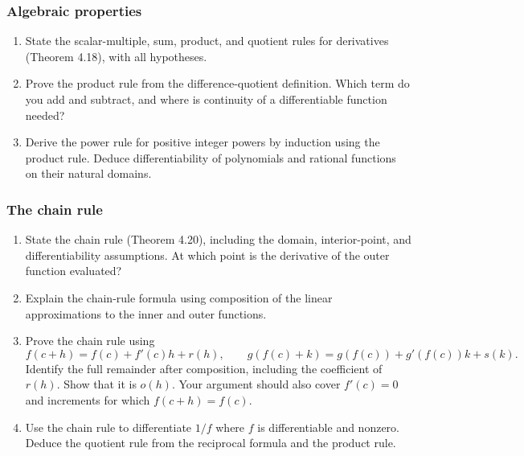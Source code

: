 \subsubsection*{Algebraic properties}
\begin{enumerate}[resume]
  \item State the scalar-multiple, sum, product, and quotient rules
    for derivatives (Theorem 4.18), with all hypotheses.

  \item Prove the product rule from the difference-quotient definition.
    Which term do you add and subtract, and where is continuity of
    a differentiable function needed?

  \item Derive the power rule for positive integer powers by induction
    using the product rule. Deduce differentiability of polynomials
    and rational functions on their natural domains.
\end{enumerate}

\subsubsection*{The chain rule}
\begin{enumerate}[resume]
  \item State the chain rule (Theorem 4.20), including the domain,
    interior-point, and differentiability assumptions.
    At which point is the derivative of the outer function evaluated?

  \item Explain the chain-rule formula using composition of the
    linear approximations to the inner and outer functions.

  \item Prove the chain rule using
    \[
      f(c+h)=f(c)+f'(c)h+r(h),\qquad
      g(f(c)+k)=g(f(c))+g'(f(c))k+s(k).
    \]
    Identify the full remainder after composition, including the
    coefficient of \(r(h)\). Show that it is \(o(h)\).
    Your argument should also cover \(f'(c)=0\) and increments
    for which \(f(c+h)=f(c)\).

  \item Use the chain rule to differentiate \(1/f\) where \(f\)
    is differentiable and nonzero. Deduce the quotient rule from
    the reciprocal formula and the product rule.
\end{enumerate}

